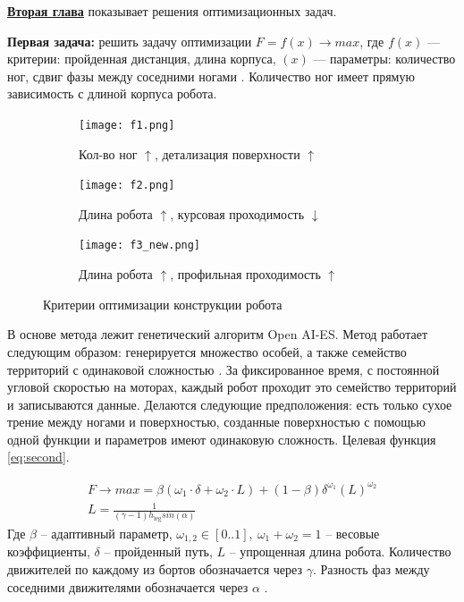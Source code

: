 
\textbf{\underline{Вторая глава}} показывает решения оптимизационных задач.

\textbf{Первая задача:} решить задачу оптимизации $F=f(x) \rightarrow max$, где  $f(x)$ --- критерии: пройденная дистанция, длина корпуса, $(x)$ --- параметры: количество ног, сдвиг фазы между соседними ногами . Количество ног имеет прямую зависимость с длиной корпуса робота. 

\begin{figure}[h]
    \begin{subfigure}{0.49\textwidth}
        \centering\texttt{[image: f1.png]}
        \caption{Кол-во ног $\uparrow$, детализация поверхности $\uparrow$}
        \label{fig:f1.png}
    \end{subfigure}
    \begin{subfigure}{0.49\textwidth}
        \centering\texttt{[image: f2.png]}
        \caption{Длина робота $\uparrow$, курсовая проходимость $\downarrow$}
        \label{fig:f2.png}
    \end{subfigure}

    \hfill
    \begin{subfigure}{\textwidth}
        \centering\texttt{[image: f3\_new.png]}
        \caption{Длина робота $\uparrow$, профильная проходимость $\uparrow$}
        \label{fig:f3.png}
    \end{subfigure}
    \hfill

\caption{Критерии оптимизации конструкции робота}
\label{fig:opti_criteria}
\end{figure}

В основе метода лежит генетический алгоритм Open AI-ES. Метод работает следующим образом: генерируется множество особей, а также семейство территорий с одинаковой сложностью . За фиксированное время, с постоянной угловой скоростью на моторах, каждый робот проходит это семейство территорий и записываются данные. Делаются следующие предположения: есть только сухое трение между ногами и поверхностью, созданные поверхностью с помощью одной функции и параметров имеют одинаковую сложность. Целевая функция \eqref{eq:second}.

\begin{align}
    \label{eq:second}
    F \rightarrow max = \beta \left( {\omega}_{1} \cdot \delta + {\omega}_{2} \cdot L\right) + (1 - \beta) {\delta}^{{\omega}_{1}} {\left( L\right)}^{{\omega}_{2}} \\
    L = \frac{1}{(\gamma - 1) h_{\text{leg}}sin(\alpha)}
\end{align}
Где $\beta$ -- адаптивный параметр, ${\omega}_{1,2} \in  [ 0..1 ],\ \omega_1 + \omega_2 = 1 $ -- весовые коэффициенты, $\delta$ -- пройденный путь, $L$ -- упрощенная длина робота. Количество движителей по каждому из бортов обозначается через $\gamma$. Разность фаз между соседними движителями обозначается через $\alpha$ .

